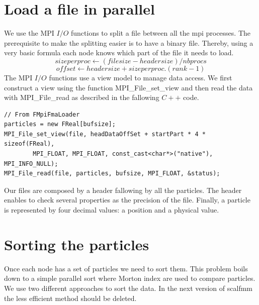 \documentclass[12pt,letterpaper,titlepage]{report}
\begin{document}
\section{Load a file in parallel}
We use the MPI $I/O$ functions to split a file between all the mpi processes.
The prerequisite to make the splitting easier is to have a binary file.
Thereby, using a very basic formula each node knows which part of the file it needs to load.
\begin{equation}
size per proc \leftarrow \left (file size - header size \right ) / nbprocs
\end{equation}
\begin{equation}
offset \leftarrow header size + size per proc .\left ( rank - 1 \right )
\end{equation}
\newline
The MPI $I/O$ functions use a view model to manage data access.
We first construct a view using the function MPI\_File\_set\_view and then read the data with MPI\_File\_read as described in the fallowing $C++$ code.
\begin{lstlisting}
// From FMpiFmaLoader
particles = new FReal[bufsize];
MPI_File_set_view(file, headDataOffSet + startPart * 4 * sizeof(FReal),
        MPI_FLOAT, MPI_FLOAT, const_cast<char*>("native"), MPI_INFO_NULL);
MPI_File_read(file, particles, bufsize, MPI_FLOAT, &status);
\end{lstlisting}
Our files are composed by a header fallowing by all the particles.
The header enables to check several properties as the precision of the file.
Finally, a particle is represented by four decimal values: a position and a physical value.
\section{Sorting the particles}
Once each node has a set of particles we need to sort them.
This problem boils down to a simple parallel sort where Morton index are used to compare particles.
We use two different approaches to sort the data.
In the next version of scalfmm the less efficient method should be deleted.
\end{document}
